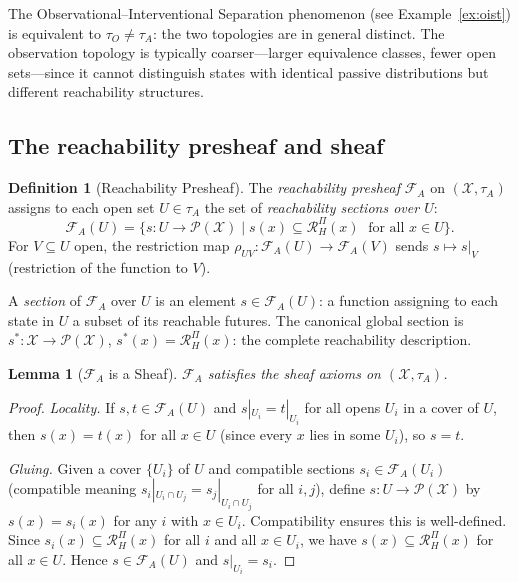 \documentclass[11pt, a4paper]{article}
\theoremstyle{plain}
\newtheorem{lemma}[theorem]{Lemma}
\theoremstyle{definition}
\newtheorem{definition}[theorem]{Definition}
\theoremstyle{remark}
\newcommand{\calX}{\mathcal{X}}
\newcommand{\calF}{\mathcal{F}}
\newcommand{\calP}{\mathcal{P}}
\newcommand{\RHP}{\mathcal{R}_{H}^{\Pi}}
\begin{document}
The Observational--Interventional Separation phenomenon (see
Example~\ref{ex:oist}) is equivalent to $\tau_O \neq \tau_A$: the two
topologies are in general distinct. The observation topology is typically
coarser---larger equivalence classes, fewer open sets---since it cannot
distinguish states with identical passive distributions but different
reachability structures.

\subsection{The reachability presheaf and sheaf}

\begin{definition}[Reachability Presheaf]
\label{def:reach_presheaf}
The \emph{reachability presheaf} $\calF_A$ on $(\calX, \tau_A)$ assigns to
each open set $U \in \tau_A$ the set of \emph{reachability sections over $U$}:
\[
  \calF_A(U) = \bigl\{ s\colon U \to \calP(\calX)
    \;\big|\; s(x) \subseteq \RHP(x)\;\text{ for all } x \in U \bigr\}.
\]
For $V \subseteq U$ open, the restriction map $\rho_{UV}\colon \calF_A(U)
\to \calF_A(V)$ sends $s \mapsto s|_V$ (restriction of the function to $V$).
\end{definition}

A \emph{section} of $\calF_A$ over $U$ is an element $s \in \calF_A(U)$: a
function assigning to each state in $U$ a subset of its reachable futures.
The canonical global section is $s^*\colon \calX \to \calP(\calX)$,
$s^*(x) = \RHP(x)$: the complete reachability description.

\begin{lemma}[$\calF_A$ is a Sheaf]
\label{lem:sheaf}
$\calF_A$ satisfies the sheaf axioms on $(\calX, \tau_A)$.
\end{lemma}

\begin{proof}
\emph{Locality.} If $s, t \in \calF_A(U)$ and $s|_{U_i} = t|_{U_i}$ for
all opens $U_i$ in a cover of $U$, then $s(x) = t(x)$ for all $x \in U$
(since every $x$ lies in some $U_i$), so $s = t$.

\emph{Gluing.} Given a cover $\{U_i\}$ of $U$ and compatible sections
$s_i \in \calF_A(U_i)$ (compatible meaning $s_i|_{U_i \cap U_j} =
s_j|_{U_i \cap U_j}$ for all $i, j$), define $s\colon U \to \calP(\calX)$
by $s(x) = s_i(x)$ for any $i$ with $x \in U_i$. Compatibility ensures
this is well-defined. Since $s_i(x) \subseteq \RHP(x)$ for all $i$ and all
$x \in U_i$, we have $s(x) \subseteq \RHP(x)$ for all $x \in U$. Hence
$s \in \calF_A(U)$ and $s|_{U_i} = s_i$.
\end{proof}
\end{document}
